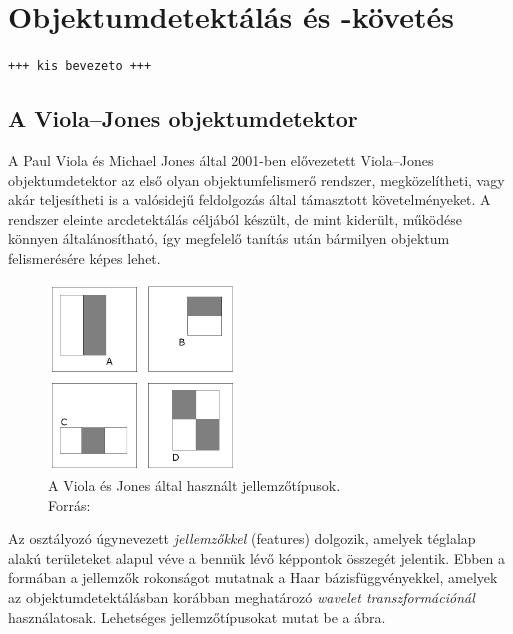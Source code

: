 \newpage
\section{Objektumdetektálás és -követés}\label{sect:objdetect}

\texttt{+++ kis bevezeto +++}

\subsection{A Viola--Jones objektumdetektor}\label{sect:viola}

A Paul Viola és Michael Jones által 2001-ben elővezetett \cite{vj} Viola--Jones objektumdetektor az első olyan objektumfelismerő rendszer, megközelítheti, vagy akár teljesítheti is a valósidejű feldolgozás által támasztott követelményeket. A rendszer eleinte arcdetektálás céljából készült, de mint kiderült, működése könnyen általánosítható, így megfelelő tanítás után bármilyen objektum felismerésére képes lehet.

\begin{figure}[!ht]
\centering
\includegraphics[width=50mm, keepaspectratio]{figures/features.png}
\caption{A Viola és Jones által használt jellemzőtípusok.\\Forrás: \cite{vj}}
\label{fig:features}
\end{figure}

Az osztályozó úgynevezett \emph{jellemzőkkel} (features) dolgozik, amelyek téglalap alakú területeket alapul véve a bennük lévő képpontok összegét jelentik. Ebben a formában a jellemzők rokonságot mutatnak a Haar bázisfüggvényekkel, amelyek az objektumdetektálásban korábban meghatározó \emph{wavelet transzformációnál} használatosak. Lehetséges jellemzőtípusokat mutat be a  ábra.

